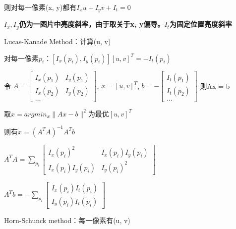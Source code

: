 \documentclass[UTF8]{ctexart}
\begin{document}
  \quad 则对每一像素(x, y)都有$I_xu + I_yv + I_t = 0$

  \quad \textbf{$I_x, I_y$仍为一图片中亮度斜率，由于取关于x, y偏导。$I_t$为固定位置亮度斜率}

  Lucas-Kanade Method：计算(u, v)

  \quad 对每一像素$p_i$：$[I_x(p_i), I_y(p_i)][u, v]^T = -I_t(p_i)$

  \quad 令
    $A = 
    \begin{bmatrix}
      I_x(p_1) & I_y(p_1) \\ 
      I_x(p_2) & I_y(p_2) \\ 
      ...
      \end{bmatrix}$, 
    $x = [u, v]^T$,
    $b = -
    \begin{bmatrix}
      I_t(p_1) \\ 
      I_t(p_2) \\ 
      ...
      \end{bmatrix}$
    则Ax = b

  \quad 取$x = argmin_x\|Ax - b\|^2$为最优$[u, v]^T$

  \quad 则有$x = (A^TA)^{-1}A^Tb$

  \quad \quad $A^TA = \sum_{p_i}
    \begin{bmatrix}
      I_x(p_i)^2 & I_x(p_i)I_y(p_i) \\ 
      I_x(p_i)I_y(p_i) & I_y(p_i)^2
      \end{bmatrix}$

  \quad \quad $A^Tb = - \sum_{p_i}
    \begin{bmatrix}
      I_x(p_i)I_t(p_i) \\ 
      I_y(p_i)I_t(p_i)
      \end{bmatrix}$







  Horn-Schunck method：每一像素有(u, v)
\end{document}
